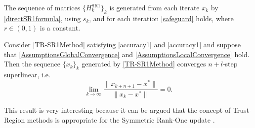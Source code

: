 \begin{assumption}\label{AssumptionsLocalConvergence}
    The sequence of matrices $\{ H^{\mathrm{SR1}}_k \}_k$ is generated from each iterate $x_k$ by \cref{directSR1formula}, using $s_k$, and for each iteration \cref{safeguard} holds, where $r \in (0, 1)$ is a constant.
\end{assumption}
\begin{theorem} \label{LocalConvergence}
    Consider \cref{TR-SR1Method} satisfying \cref{accuracy1} and \cref{accuracy1} and suppose that \cref{AssumptionsGlobalConvergence} and \cref{AssumptionsLocalConvergence} hold. Then the sequence $\{ x_k \}_k$ generated by \cref{TR-SR1Method} converges $n+l$-step superlinear, i.e. 
    \begin{equation}\label{n+1superlinear}
        \lim_{k \rightarrow \infty} \frac{\lVert x_{k+n+1} - x^* \rVert}{\lVert x_k - x^* \rVert} = 0.
    \end{equation}
\end{theorem}
This result is very interesting because it can be argued that the concept of Trust-Region methods is appropriate for the Symmetric Rank-One update \cite[p.~1025]{ByrdKhalfanSchnabel:1996}.
